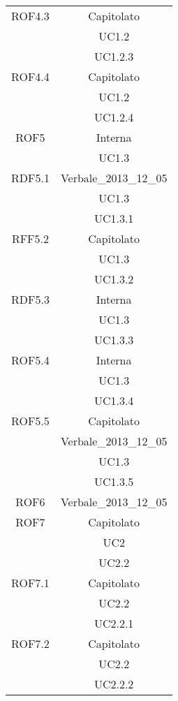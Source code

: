 \begin{longtable}{|c|c|}
\midrule
ROF4.3
& Capitolato\\
& UC1.2\\
& UC1.2.3\\

\midrule
ROF4.4
& Capitolato\\
& UC1.2\\
& UC1.2.4\\

\midrule
ROF5
& Interna\\
& UC1.3\\

\midrule
RDF5.1
& Verbale\_2013\_12\_05\\
& UC1.3\\
& UC1.3.1\\

\midrule
RFF5.2
& Capitolato\\
& UC1.3\\
& UC1.3.2\\

\midrule
RDF5.3
& Interna\\
& UC1.3\\
& UC1.3.3\\

\midrule
ROF5.4
& Interna\\
& UC1.3\\
& UC1.3.4\\

\midrule
ROF5.5
& Capitolato\\
& Verbale\_2013\_12\_05\\
& UC1.3\\
& UC1.3.5\\


\midrule
ROF6
& Verbale\_2013\_12\_05\\

\midrule
ROF7
& Capitolato\\
& UC2\\
& UC2.2\\

\midrule
ROF7.1
& Capitolato\\
& UC2.2\\
& UC2.2.1\\

\midrule
ROF7.2
& Capitolato\\
& UC2.2\\
& UC2.2.2\\


\end{longtable}

